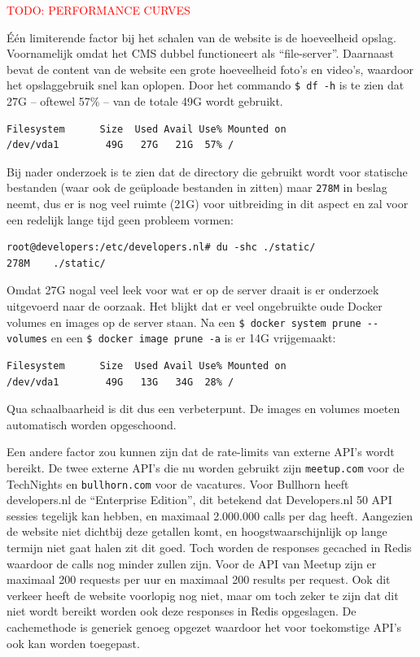 \textcolor{red}{TODO: PERFORMANCE CURVES} %

Één limiterende factor bij het schalen van de website is de hoeveelheid opslag. Voornamelijk omdat het CMS dubbel functioneert als \enquote{file-server}. Daarnaast bevat de content van de website een grote hoeveelheid foto's en video's, waardoor het opslaggebruik snel kan oplopen. Door het commando \texttt{\$ df -h} is te zien dat 27G -- oftewel 57\% -- van de totale 49G wordt gebruikt.
\begin{verbatim}
Filesystem      Size  Used Avail Use% Mounted on
/dev/vda1        49G   27G   21G  57% /
\end{verbatim}
Bij nader onderzoek is te zien dat de directory die gebruikt wordt voor statische bestanden (waar ook de geüploade bestanden in zitten) maar \texttt{278M} in beslag neemt, dus er is nog veel ruimte (21G) voor uitbreiding in dit aspect en zal voor een redelijk lange tijd geen probleem vormen:
\begin{verbatim}
root@developers:/etc/developers.nl# du -shc ./static/
278M	./static/
\end{verbatim}

Omdat 27G nogal veel leek voor wat er op de server draait is er onderzoek uitgevoerd naar de oorzaak. Het blijkt dat er veel ongebruikte oude Docker volumes en images op de server staan. Na een \texttt{\$ docker system prune -\--volumes} en een \texttt{\$ docker image prune -a} is er 14G vrijgemaakt:
\begin{verbatim}
Filesystem      Size  Used Avail Use% Mounted on
/dev/vda1        49G   13G   34G  28% /
\end{verbatim}
Qua schaalbaarheid is dit dus een verbeterpunt. De images en volumes moeten automatisch worden opgeschoond.

Een andere factor zou kunnen zijn dat de rate-limits van externe API's wordt bereikt. De twee externe API's die nu worden gebruikt zijn \texttt{meetup.com} voor de TechNights en \texttt{bullhorn.com} voor de vacatures. Voor Bullhorn heeft developers.nl de \enquote{Enterprise Edition}, dit betekend dat Developers.nl 50 API sessies tegelijk kan hebben, en maximaal 2.000.000 calls per dag heeft. Aangezien de website niet dichtbij deze getallen komt, en hoogstwaarschijnlijk op lange termijn niet gaat halen zit dit goed. Toch worden de responses gecached in Redis waardoor de calls nog minder zullen zijn. Voor de API van Meetup zijn er maximaal 200 requests per uur en maximaal 200 results per request. Ook dit verkeer heeft de website voorlopig nog niet, maar om toch zeker te zijn dat dit niet wordt bereikt worden ook deze responses in Redis opgeslagen. De cachemethode is generiek genoeg opgezet waardoor het voor toekomstige API's ook kan worden toegepast. 

